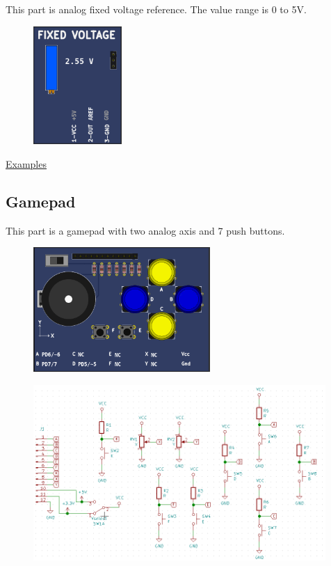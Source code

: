 This part is analog fixed voltage reference. The value range is 0 to 5V.

\begin{figure}[H]
\center
\includegraphics[width=0.3\textwidth]{img/part_fixedv.png} 
\end{figure} 


\href{https://lcgamboa.github.io/picsimlab_examples/Parts.html\#Fixed_Voltage}{Examples}

 
\subsection{Gamepad}

This part is a gamepad with two analog axis and 7 push buttons.

\begin{figure}[H]
\center
\includegraphics[width=0.6\textwidth]{img/part_gamepad.png} 
\end{figure} 

\begin{figure}[H]
\center
\includegraphics[width=0.99\textwidth]{img/part_gamepad_.png} 
\end{figure} 

